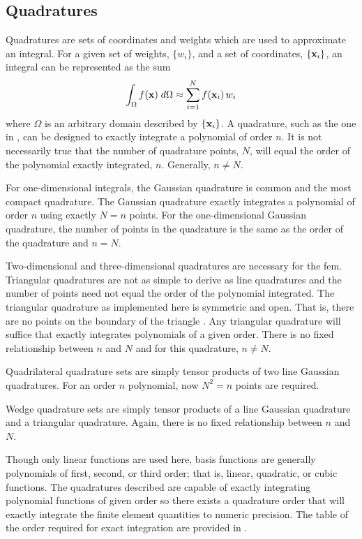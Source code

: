   \subsection{Quadratures}
    \label{sec:quadratures}
    Quadratures are sets of coordinates and weights which are used to
    approximate an integral.  For a given set of weights, $\{w_i\}$, and a set
    of coordinates, $\{\mathbf{x}_i\}$, an integral can be represented as the sum
    \begin{equation}
      \label{eq:quadrature}
      \int_{\Omega} f(\mathbf{x}) \;d\Omega \approx \sum_{i=1}^{N} f(\mathbf{x}_i) \, w_i 
    \end{equation}
    where $\Omega$ is an arbitrary domain described by $\{\mathbf{x}_i\}$.  A
    quadrature, such as the one in , can be designed to
    exactly integrate a polynomial of order $n$. It is not necessarily true that
    the number of quadrature points, $N$, will equal the order of the polynomial
    exactly integrated, $n$. Generally, $n \ne N$.
    
    For one-dimensional integrals, the Gaussian quadrature is common and the
    most compact quadrature. The Gaussian quadrature exactly integrates a
    polynomial of order $n$ using exactly $N=n$ points. For the one-dimensional
    Gaussian quadrature, the number of points in the quadrature is the same as 
    the order of the quadrature and $n=N$.
    
    Two-dimensional and three-dimensional quadratures are necessary for the 
    \gls{fem}. Triangular quadratures are not as simple to derive
    as line quadratures and the number of points need not equal the order of the
    polynomial integrated. The triangular quadrature as implemented here is 
    symmetric and open. That is, there are no points on the boundary of the 
    triangle \cite{triangleQuadrature}. Any triangular quadrature will suffice
    that exactly integrates polynomials of a given order. There is no fixed
    relationship between $n$ and $N$ and for this quadrature, $n \ne N$.
    
    Quadrilateral quadrature sets are simply tensor products of two line 
    Gaussian quadratures. For an order $n$ polynomial, now $N^2=n$ points are 
    required. 
    
    Wedge quadrature sets are simply tensor products of a line Gaussian 
    quadrature and a triangular quadrature. Again, there is no fixed
    relationship between $n$ and $N$.
    
    Though only linear functions are used here, basis functions are generally
    polynomials of first, second, or third order; that is, linear, quadratic, or
    cubic functions. The quadratures described are capable of exactly
    integrating polynomial functions of given order so there exists a quadrature
    order that will exactly integrate the finite element quantities to numeric
    precision. The table of the order required for exact integration are
    provided in .

